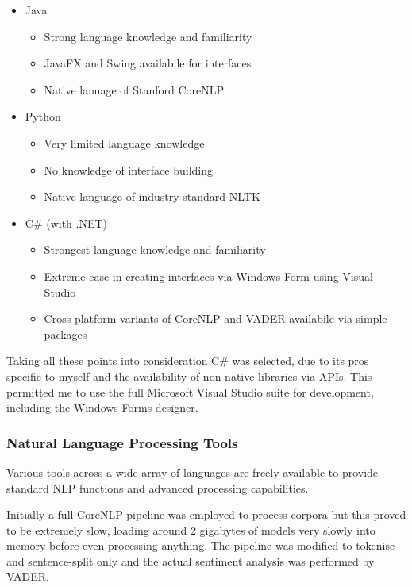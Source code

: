 \documentclass{article}
\begin{document}
        \begin{itemize}
            \item Java
            \begin{itemize}
                \item Strong language knowledge and familiarity
                \item JavaFX and Swing availabile for interfaces
                \item Native lanuage of Stanford CoreNLP
            \end{itemize}
            \item Python
            \begin{itemize}
                \item Very limited language knowledge
                \item No knowledge of interface building
                \item Native language of industry standard NLTK
            \end{itemize}
            \item C\# (with .NET)
            \begin{itemize}
                \item Strongest language knowledge and familiarity
                \item Extreme ease in creating interfaces via Windows Form using Visual Studio
                \item Cross-platform variants of CoreNLP and VADER availabile via simple packages
            \end{itemize}
        \end{itemize}
        Taking all these points into consideration C\# was selected, due to its pros specific to myself and the availability of non-native libraries via APIs. This permitted me to use the full Microsoft Visual Studio suite for development, including the Windows Forms designer.
        \subsubsection{Natural Language Processing Tools}
        Various tools across a wide array of languages are freely available to provide standard NLP functions and advanced processing capabilities.

        Initially a full CoreNLP pipeline was employed to process corpora but this proved to be extremely slow, loading around 2 gigabytes of models very slowly into memory before even processing anything. The pipeline was modified to tokenise and sentence-split only and the actual sentiment analysis was performed by VADER.
\end{document}
